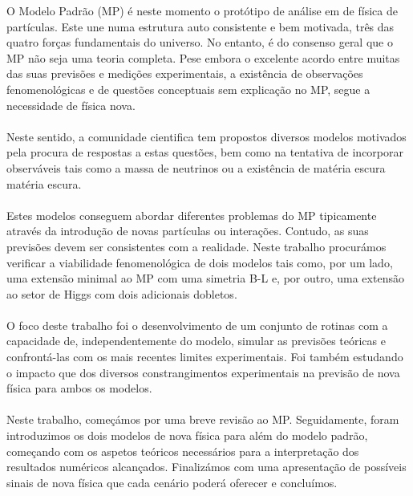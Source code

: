 \documentclass[10pt]{report}
\renewcommand{\(}{\left(}
\renewcommand{\)}{\right)}
\renewcommand{\[}{\left[}
\renewcommand{\]}{\right]}
\begin{document}
\TitlePage
  \vspace*{55mm}
       {O Modelo Padrão (MP) é neste momento o protótipo de análise em de física de partículas. 
       	Este une numa estrutura auto consistente e bem motivada, três das quatro forças fundamentais do universo. 
       	No entanto, é do consenso geral que o MP não seja uma teoria completa. 
       	Pese embora o excelente acordo entre muitas das suas previsões e medições experimentais, a existência de observações fenomenológicas e de questões conceptuais sem explicação no MP, segue a necessidade de física nova. 
       	\\ \ \\ 
       	Neste sentido, a comunidade cientifica tem propostos diversos modelos motivados pela procura de respostas a estas questões, bem como na tentativa de incorporar observáveis tais como a massa de neutrinos ou a existência de matéria escura matéria escura.
       	\\ \ \\ 
       	Estes modelos conseguem abordar diferentes problemas do MP tipicamente através da introdução de novas partículas ou interações. 
       	Contudo, as suas previsões devem ser consistentes com a realidade. 
       	Neste trabalho procurámos verificar a viabilidade fenomenológica de dois modelos tais como, por um lado, uma extensão minimal ao MP com uma simetria B-L e, por outro, uma extensão ao setor de Higgs com dois adicionais dobletos.
       	\\ \ \\
       	O foco deste trabalho foi o desenvolvimento de um conjunto de rotinas com a capacidade de, independentemente do modelo, simular as previsões teóricas e confrontá-las com os mais recentes limites experimentais.
       	Foi também estudando o impacto que dos diversos constrangimentos experimentais na previsão de nova física para ambos os modelos.
       	\\ \ \\                                                                                                                                                                                                                                                                                                                                                                
       	Neste trabalho, começámos por uma breve revisão ao MP. Seguidamente, foram introduzimos os dois modelos de nova física para além do modelo padrão, começando com os aspetos teóricos necessários para a interpretação dos resultados numéricos alcançados. Finalizámos com uma apresentação de possíveis sinais de nova física que cada cenário poderá oferecer e concluímos.
       }
\EndTitlePage
\titlepage\ \endtitlepage %
\end{document}
